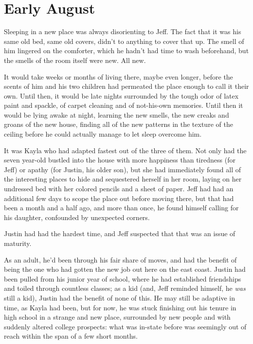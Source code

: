 \chapter{Early August}

Sleeping in a new place was always disorienting to Jeff.  The fact that it was his same old bed, same old covers, didn't to anything to cover that up.  The smell of him lingered on the comforter, which he hadn't had time to wash beforehand, but the smells of the room itself were new.  All new.

It would take weeks or months of living there, maybe even longer, before the scents of him and his two children had permeated the place enough to call it their own.  Until then, it would be late nights surrounded by the tough odor of latex paint and spackle, of carpet cleaning and of not-his-own memories.  Until then it would be lying awake at night, learning the new smells, the new creaks and groans of the new house, finding all of the new patterns in the texture of the ceiling before he could actually manage to let sleep overcome him.

It was Kayla who had adapted fastest out of the three of them.  Not only had the seven year-old bustled into the house with more happiness than tiredness (for Jeff) or apathy (for Justin, his older son), but she had immediately found all of the interesting places to hide and sequestered herself in her room, laying on her undressed bed with her colored pencils and a sheet of paper.  Jeff had had an additional few days to scope the place out before moving there, but that had been a month and a half ago, and more than once, he found himself calling for his daughter, confounded by unexpected corners.

Justin had had the hardest time, and Jeff suspected that that was an issue of maturity.

As an adult, he'd been through his fair share of moves, and had the benefit of being the one who had gotten the new job out here on the east coast.  Justin had been pulled from his junior year of school, where he had established friendships and toiled through countless classes; as a kid (and, Jeff reminded himself, he \textit{was} still a kid), Justin had the benefit of none of this.  He may still be adaptive in time, as Kayla had been, but for now, he was stuck finishing out his tenure in high school in a strange and new place, surrounded by new people and with suddenly altered college prospects: what was in-state before was seemingly out of reach within the span of a few short months.

